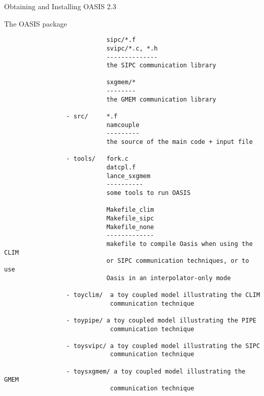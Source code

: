 \begin{section}{Obtaining and Installing OASIS 2.3}
\begin{subsection}{The OASIS package}
\begin{verbatim}
                            sipc/*.f
                            svipc/*.c, *.h
                            --------------
                            the SIPC communication library
 
                            sxgmem/*
                            --------
                            the GMEM communication library

                 - src/     *.f 
                            namcouple
                            ---------
                            the source of the main code + input file 

                 - tools/   fork.c
                            datcpl.f
                            lance_sxgmem
                            ----------
                            some tools to run OASIS

                            Makefile_clim
                            Makefile_sipc
                            Makefile_none
                            -------------
                            makefile to compile Oasis when using the CLIM 
                            or SIPC communication techniques, or to use 
                            Oasis in an interpolator-only mode

                 - toyclim/  a toy coupled model illustrating the CLIM 
                             communication technique

                 - toypipe/ a toy coupled model illustrating the PIPE 
                             communication technique

                 - toysvipc/ a toy coupled model illustrating the SIPC 
                             communication technique

                 - toysxgmem/ a toy coupled model illustrating the GMEM 
                             communication technique

\end{verbatim}
\end{subsection}


\end{section}
%
